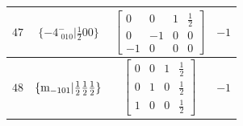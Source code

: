 \documentclass[fleqn,8pt]{jsarticle}
\begin{document}
\begin{longtable}{cccc}
$ 47 $ & $ \{-4^{-}_{\,\,010}|\frac{1}{2} 0 0\} $ & $ \begin{bmatrix} 0 & 0 & 1 & \frac{1}{2} \\ 0 & -1 & 0 & 0 \\ -1 & 0 & 0 & 0 \end{bmatrix} $ & $ -1 $ \\ \hline
$ 48 $ & $ \{{\rm m}_{-101}|\frac{1}{2} \frac{1}{2} \frac{1}{2}\} $ & $ \begin{bmatrix} 0 & 0 & 1 & \frac{1}{2} \\ 0 & 1 & 0 & \frac{1}{2} \\ 1 & 0 & 0 & \frac{1}{2} \end{bmatrix} $ & $ -1 $ \\
\end{longtable}
\end{document}

